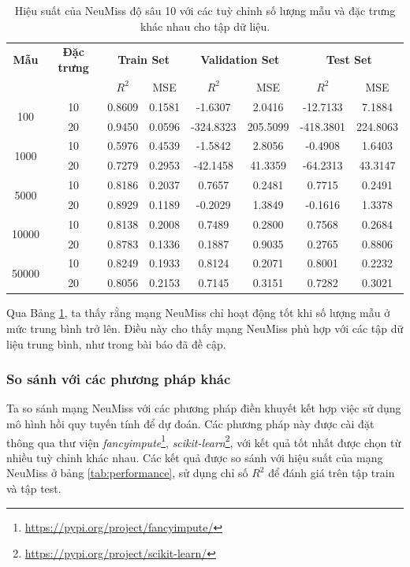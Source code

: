 \begin{table}[h!]
\centering
\setlength{\tabcolsep}{6pt}
\begin{tabular}{cccccccc}
\toprule
\textbf{Mẫu} & \textbf{Đặc trưng} & \multicolumn{2}{c}{\textbf{Train Set}} & \multicolumn{2}{c}{\textbf{Validation Set}} & \multicolumn{2}{c}{\textbf{Test Set}} \\
\cmidrule(lr){3-4}\cmidrule(lr){5-6}\cmidrule(lr){7-8}
 & & $R^2$ & MSE & $R^2$ & MSE & $R^2$ & MSE \\
\midrule
\multirow{2}{*}{100} & 10 & 0.8609 & 0.1581 & -1.6307 & 2.0416 & -12.7133 & 7.1884 \\
                     & 20 & 0.9450 & 0.0596 & -324.8323 & 205.5099 & -418.3801 & 224.8063 \\
\midrule
\multirow{2}{*}{1000} & 10 & 0.5976 & 0.4539 & -1.5842 & 2.8056 & -0.4908 & 1.6403 \\
                      & 20 & 0.7279 & 0.2953 & -42.1458 & 41.3359 & -64.2313 & 43.3147 \\
\midrule
\multirow{2}{*}{5000} & 10 & 0.8186 & 0.2037 & 0.7657 & 0.2481 & 0.7715 & 0.2491 \\
                      & 20 & 0.8929 & 0.1189 & -0.2029 & 1.3849 & -0.1616 & 1.3378 \\
\midrule
\multirow{2}{*}{10000} & 10 & 0.8138 & 0.2008 & 0.7489 & 0.2800 & 0.7568 & 0.2684 \\
                       & 20 & 0.8783 & 0.1336 & 0.1887 & 0.9035 & 0.2765 & 0.8806 \\
\midrule
\multirow{2}{*}{50000} & 10 & 0.8249 & 0.1933 & 0.8124 & 0.2071 & 0.8001 & 0.2232 \\
                       & 20 & 0.8056 & 0.2153 & 0.7145 & 0.3151 & 0.7282 & 0.3021 \\
\bottomrule
\end{tabular}
\captionsetup{justification=centering, width=\linewidth}
\caption{Hiệu suất của NeuMiss độ sâu 10 với các tuỳ chỉnh số lượng mẫu và đặc trưng khác nhau cho tập dữ liệu.}
\label{tab:performance_grouped_samples_features}
\end{table}

Qua Bảng \ref{tab:performance_grouped_samples_features}, ta thấy rằng mạng NeuMiss chỉ hoạt động tốt khi số lượng mẫu ở mức trung bình trở lên. Điều này cho thấy mạng NeuMiss phù hợp với các tập dữ liệu trung bình, như trong bài báo \cite{le2020neumiss} đã đề cập.


\subsubsection*{So sánh với các phương pháp khác}
Ta so sánh mạng NeuMiss với các phương pháp điền khuyết kết hợp việc sử dụng mô hình hồi quy tuyến tính để dự đoán. 
Các phương pháp này được cài đặt thông qua thư viện \textit{fancyimpute}\footnote{\href{https://pypi.org/project/fancyimpute/}{https://pypi.org/project/fancyimpute/}}, \textit{scikit-learn}\footnote{\href{https://pypi.org/project/scikit-learn/}{https://pypi.org/project/scikit-learn/}}, với kết quả tốt nhất được chọn từ nhiều tuỳ chỉnh khác nhau.
Các kết quả được so sánh với hiệu suất của mạng NeuMiss ở bảng \ref{tab:performance}, sử dụng chỉ số $R^2$ để đánh giá trên tập train và tập test. 

